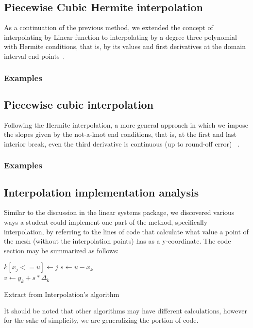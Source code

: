\subsection{Piecewise Cubic Hermite interpolation}
As a continuation of the previous method, we extended the concept of interpolating by Linear function to interpolating by a degree three polynomial with Hermite conditions, that is, by its values and first derivatives at the domain interval end points~\cite{kreyszig11}.
\subsubsection{Examples}
	


\subsection{Piecewise cubic interpolation}
Following the Hermite interpolation, a more general approach in which we impose the slopes given by the not-a-knot end conditions, that is, at the first and last interior break, even the third derivative is continuous (up to round-off error) ~\cite{PCHIP}.

\subsubsection{Examples}
	

\subsection{Interpolation implementation analysis}

Similar to the discussion in the linear systems package, we discovered various ways a student could implement one part of the method, specifically interpolation, by referring to the lines of code that calculate what value a point of the mesh (without the interpolation points) has as a y-coordinate. The code section may be summarized as follows: 



\begin{algorithm}[H]
\SetAlgoLined
{} {
$k[x_j <= u] \gets j$
}
$s \gets u - x_k$\\
$v \gets y_k + s * \Delta_k$

\caption{Extract from Interpolation's algorithm}
\end{algorithm}
It should be noted that other algorithms may have different calculations, however for the sake of simplicity, we are generalizing the portion of code.



